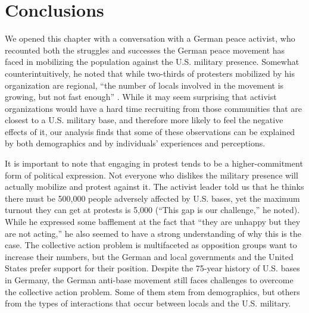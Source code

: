 \section*{Conclusions}



We opened this chapter with a conversation with a German peace activist, who recounted both the struggles and successes the German peace movement has faced in mobilizing the population against the U.S. military presence. Somewhat counterintuitively, he noted that while two-thirds of protesters mobilized by his organization are regional, ``the number of locals involved in the movement is growing, but not fast enough'' \cite{berlinone20190723}. While it may seem surprising that activist organizations would have a hard time recruiting from those communities that are closest to a U.S. military base, and therefore more likely to feel the negative effects of it, our analysis finds that some of these observations can be explained by both demographics and by individuals' experiences and perceptions.    


It is important to note that engaging in protest tends to be a higher-commitment form of political expression. Not everyone who dislikes the military presence will actually mobilize and protest against it.  The activist leader told us that he thinks there must be 500,000 people adversely affected by U.S. bases, yet the maximum turnout they can get at protests is 5,000 (``This gap is our challenge,'' he noted). While he expressed some bafflement at the fact that ``they are unhappy but they are not acting,'' he also seemed to have a strong understanding of why this is the case. The collective action problem is multifaceted as opposition groups want to increase their numbers, but the German and local governments and the United States prefer support for their position. Despite the 75-year history of U.S. bases in Germany, the German anti-base movement still faces challenges to overcome the collective action problem. Some of them stem from demographics, but others from the types of interactions that occur between locals and the U.S. military.


